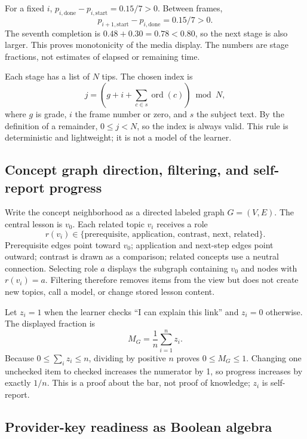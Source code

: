 \documentclass[11pt]{article}
\theoremstyle{plain}
\theoremstyle{definition}
\begin{document}
For a fixed $i$, $p_{i,\mathrm{done}}-p_{i,\mathrm{start}}=0.15/7>0$. Between frames,
\[
p_{i+1,\mathrm{start}}-p_{i,\mathrm{done}}=0.15/7>0.
\]
The seventh completion is $0.48+0.30=0.78<0.80$, so the next stage is also larger. This proves monotonicity of the media display. The numbers are stage fractions, not estimates of elapsed or remaining time.

Each stage has a list of $N$ tips. The chosen index is
\begin{equation}
j=(g+i+\textstyle\sum_{c\in s}\operatorname{ord}(c))\bmod N,
\end{equation}
where $g$ is grade, $i$ the frame number or zero, and $s$ the subject text. By the definition of a remainder, $0\le j<N$, so the index is always valid. This rule is deterministic and lightweight; it is not a model of the learner.

\subsection{Concept graph direction, filtering, and self-report progress}
\label{app:graph}

Write the concept neighborhood as a directed labeled graph $G=(V,E)$. The central lesson is $v_0$. Each related topic $v_i$ receives a role
\[
r(v_i)\in\{\text{prerequisite, application, contrast, next, related}\}.
\]
Prerequisite edges point toward $v_0$; application and next-step edges point outward; contrast is drawn as a comparison; related concepts use a neutral connection. Selecting role $a$ displays the subgraph containing $v_0$ and nodes with $r(v_i)=a$. Filtering therefore removes items from the view but does not create new topics, call a model, or change stored lesson content.

Let $z_i=1$ when the learner checks ``I can explain this link'' and $z_i=0$ otherwise. The displayed fraction is
\begin{equation}
M_G=\frac1n\sum_{i=1}^nz_i.
\end{equation}
Because $0\le\sum_i z_i\le n$, dividing by positive $n$ proves $0\le M_G\le1$. Changing one unchecked item to checked increases the numerator by 1, so progress increases by exactly $1/n$. This is a proof about the bar, not proof of knowledge; $z_i$ is self-report.

\subsection{Provider-key readiness as Boolean algebra}
\end{document}
